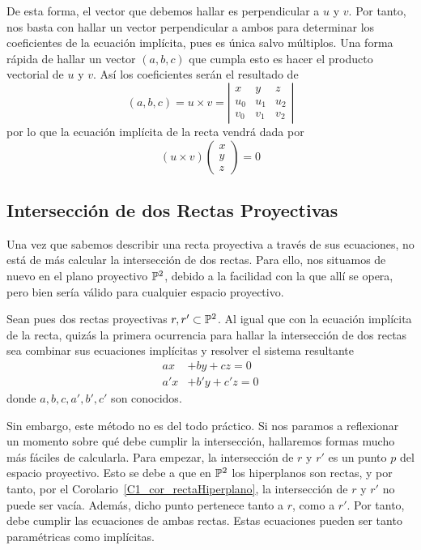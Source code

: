 De esta forma, el vector que debemos hallar es perpendicular a $u$ y $v$. Por tanto, nos basta con hallar un vector perpendicular a ambos para determinar los coeficientes de la ecuación implícita, pues es única salvo múltiplos. Una forma rápida de hallar un vector $(a,b,c)$ que cumpla esto es hacer el producto vectorial de $u$ y $v$. Así los coeficientes serán el resultado de 
\begin{equation}
	\label{C3_eq_implicita_cross_coef}
	(a,b,c)=u\times v=\left| \begin{array}{ccc}
		x & y & z\\
		u_0 & u_1 & u_2\\
		v_0 & v_1 & v_2
	\end{array}\right| 
\end{equation}
por lo que la ecuación implícita de la recta vendrá dada por 
\begin{equation}
\label{C3_eq_implicita_cross}
	(u\times v)\left( \begin{array}{c}
	x\\
	y\\
	z
	\end{array}\right) =0
\end{equation}
\subsection{Intersección de dos Rectas Proyectivas}
\label{C3_interseccionRectas}
Una vez que sabemos describir una recta proyectiva a través de sus ecuaciones, no está de más calcular la intersección de dos rectas. Para ello, nos situamos de nuevo en el plano proyectivo $\mathbb{P}^2$, debido a la facilidad con la que allí se opera, pero bien sería válido para cualquier espacio proyectivo.

Sean pues dos rectas proyectivas $r,r'\subset\mathbb{P}^2$. Al igual que con la ecuación implícita de la recta, quizás la primera ocurrencia para hallar la intersección de dos rectas sea combinar sus ecuaciones implícitas y resolver el sistema resultante
\begin{equation*}
	\begin{split}
		ax&+by+cz=0\\
		a'x&+b'y+c'z=0
	\end{split}
\end{equation*}
donde $a,b,c,a',b',c'$ son conocidos.

Sin embargo, este método no es del todo práctico. Si nos paramos a reflexionar un momento sobre qué debe cumplir la intersección, hallaremos formas mucho más fáciles de calcularla. Para empezar, la intersección de $r$ y $r'$ es un punto $p$ del espacio proyectivo. Esto se debe a que en $\mathbb{P}^2$ los hiperplanos son rectas, y por tanto, por el Corolario~\ref{C1_cor_rectaHiperplano}, la intersección de $r$ y $r'$ no puede ser vacía. Además, dicho punto pertenece tanto a $r$, como a $r'$. Por tanto, debe cumplir las ecuaciones de ambas rectas. Estas ecuaciones pueden ser tanto paramétricas como implícitas.

